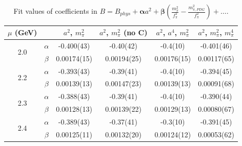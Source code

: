 \documentclass[12pt]{extarticle}
\begin{document}
\begin{table}[h!]
\begin{center}
\begin{tabular}{|c c|c|c|c|c|}
\hline
$\mu$ (GeV) &  & $a^2$, $m_\pi^2$& $a^2$, $m_\pi^2$ (no C)& $a^2$, $a^4$, $m_\pi^2$& $a^2$, $m_\pi^2$, $m_\pi^4$\\
\hline
\multirow{2}{0.5in}{2.0} & $\alpha$ & -0.400(43)& -0.40(42)& -0.4(10)& -0.401(46)\\
 & $\beta$ & 0.00174(15)& 0.00194(25)& 0.00176(15)& 0.00117(65)\\
\hline
\multirow{2}{0.5in}{2.2} & $\alpha$ & -0.393(43)& -0.39(41)& -0.4(10)& -0.394(45)\\
 & $\beta$ & 0.00139(13)& 0.00147(23)& 0.00139(13)& 0.00091(68)\\
\hline
\multirow{2}{0.5in}{2.3} & $\alpha$ & -0.388(43)& -0.39(41)& -0.4(10)& -0.390(44)\\
 & $\beta$ & 0.00128(13)& 0.00139(22)& 0.00129(13)& 0.00080(67)\\
\hline
\multirow{2}{0.5in}{2.4} & $\alpha$ & -0.389(43)& -0.37(41)& -0.3(10)& -0.391(45)\\
 & $\beta$ & 0.00125(11)& 0.00132(20)& 0.00124(12)& 0.00053(62)\\
\hline
\end{tabular}
\caption{Fit values of coefficients in $B = B_{phys} + \mathbf{\alpha} a^2 + \mathbf{\beta}\left(\frac{m_\pi^2}{f_\pi^2}-\frac{m_{\pi,PDG}^2}{f_\pi^2}\right) + \ldots$.}
\end{center}
\end{table}
















\clearpage
\end{document}
